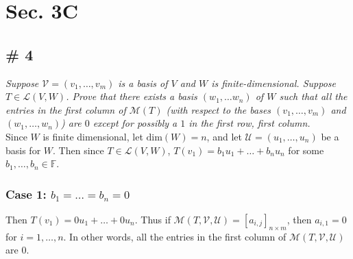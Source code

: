 \documentclass[12pt]{article}
\begin{document}
\section*{Sec. 3C}
\subsection*{\# 4}
{\it Suppose $\mathcal{V} = (v_1, \dots, v_m)$ is a basis of $V$ and $W$ is finite-dimensional.  Suppose $T \in \mathcal{L}(V, W)$.  Prove that there exists a basis $(w_1, \dots w_n)$ of $W$ such that all the entries in the first column of $\mathcal{M}(T)$ (with respect to the bases $(v_1, \dots, v_m)$ and $(w_1, \dots, w_n)$) are $0$ except for possibly a $1$ in the first row, first column.} \\

\noindent
Since $W$ is finite dimensional, let $\text{dim}(W) = n$, and let $\mathcal{U} = (u_1, \dots, u_n)$ be a basis for $W$.  Then since $T \in \mathcal{L}(V, W)$, $T(v_1) = b_1u_1 + \dots + b_nu_n$ for some $b_1, \dots, b_n \in \mathbb{F}$.
\subsubsection*{Case 1: $b_1 = \dots = b_n = 0$}
Then $T(v_1) = 0u_1 + \dots + 0u_n$.  Thus if $\mathcal{M}(T, \mathcal{V}, \mathcal{U}) = [a_{i,j}]_{n\times m}$, then $a_{i,1} = 0$ for $i = 1, \dots, n$.  In other words, all the entries in the first column of $\mathcal{M}(T, \mathcal{V}, \mathcal{U})$ are $0$.
\end{document}
